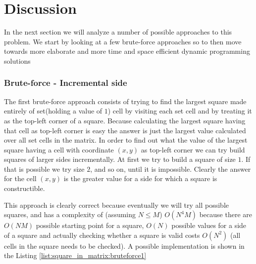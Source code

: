 \section{Discussion}
\label{square_in_matrix:sec:discussion}
In the next section we will analyze a number of possible approaches to this problem. We start by
looking at a few brute-force approaches so to then move towards more elaborate and more time and
space efficient dynamic programming solutions

\subsubsection{Brute-force - Incremental side}
\label{square_in_matrix:sec:incremental_side}
The first brute-force approach consists of trying to find the largest square made entirely of
set(holding a value of $1$) cell by visiting each set cell and by treating it as the top-left corner
of a square. Because calculating the largest square having that cell as top-left corner is easy the
answer is just the largest value calculated over all set cells in the matrix. In order to find out
what the value of the largest square having a cell with coordinate $(x,y)$ as top-left corner we can
try build squares of larger sides incrementally. At first we try to build a square of size $1$. If
that is possible we try size $2$, and so on, until it is impossible. Clearly the answer for the cell
$(x,y)$ is the greater value for a side for which a square is constructible. 

This approach is clearly correct because eventually we will try all possible squares, and has a
complexity of (assuming $N \leq M$) $O(N^4M)$ because there are $O(NM)$ possible starting point for
a square, $O(N)$ possible values for a side of a square and actually checking whether a square is
valid costs $O(N^2)$ (all cells in the square needs to be checked). A possible implementation is
shown in the Listing \ref{list:square_in_matrix:bruteforce1}





